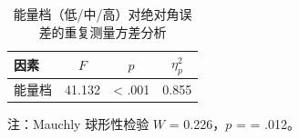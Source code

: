 \begin{table}[htbp]
  \centering
  \caption{能量档（低/中/高）对绝对角误差的重复测量方差分析}
  \label{tab:infer-rm-anova}
  \begin{tabular}{lccc}
    \toprule
    因素 & $F$ & $p$ & $\eta_p^2$ \\
    \midrule
    能量档 & 41.132 & < .001 & 0.855 \\
    \bottomrule
  \end{tabular}
  \begin{flushleft}
    \footnotesize
    注：Mauchly 球形性检验 $W$ = 0.226，$p$ = = .012。
  \end{flushleft}
\end{table}
